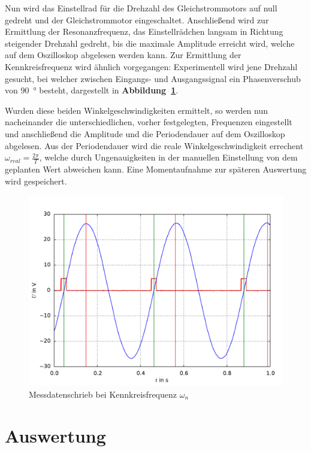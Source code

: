 \documentclass[a4paper,12pt]{scrartcl}
\begin{document}
Nun wird das Einstellrad für die Drehzahl des Gleichstrommotors auf null gedreht und der Gleichstrommotor eingeschaltet. Anschließend wird zur
Ermittlung der Resonanzfrequenz, das Einstellrädchen langsam in Richtung steigender Drehzahl gedreht, bis die maximale Amplitude erreicht wird, welche auf
dem Oszilloskop abgelesen werden kann. Zur Ermittlung der Kennkreisfrequenz wird ähnlich vorgegangen: Experimentell wird jene Drehzahl gesucht, bei welcher
zwischen Eingangs- und Ausgangssignal ein Phasenverschub von  \SI{90}{\degree} besteht, dargestellt in \textbf{Abbildung~\ref{fig:plot-kennkreis}}.

Wurden diese beiden Winkelgeschwindigkeiten ermittelt, so werden nun nacheinander die unterschiedlichen, vorher festgelegten, Frequenzen eingestellt und
anschließend die Amplitude und die Periodendauer auf dem Oszilloskop abgelesen. Aus der Periodendauer wird die reale Winkelgeschwindigkeit errechent $\omega_{real} = \frac{2\pi}{T}$,
welche durch Ungenauigkeiten in der manuellen Einstellung von dem geplanten Wert abweichen kann. Eine Momentaufnahme zur späteren Auswertung wird gespeichert.

\begin{figure}[h]
\centering
\includegraphics[width=\textwidth]{kennkreis.pdf}
\caption{Messdatenschrieb bei Kennkreisfrequenz $\omega_{n}$}
\label{fig:plot-kennkreis}
\end{figure}

\section{Auswertung}
\end{document}
